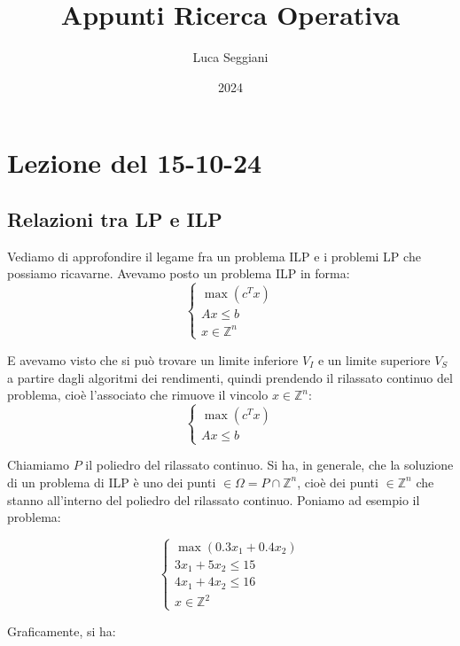 \documentclass[a4paper,11pt]{article}
\title{Appunti Ricerca Operativa}
\author{Luca Seggiani}
\date{2024}
\begin{document}
\section{Lezione del 15-10-24}

\thispagestyle{empty}
\pagestyle{fancy}


\subsection{Relazioni tra LP e ILP}
Vediamo di approfondire il legame fra un problema ILP e i problemi LP che possiamo ricavarne.
Avevamo posto un problema ILP in forma:
\[
	\begin{cases}
			\max (c^T x) \\ 
			Ax \leq b \\ 
			x \in \mathbb{Z}^n
	\end{cases}
\]

E avevamo visto che si può trovare un limite inferiore $V_I$ e un limite superiore $V_S$ a partire dagli algoritmi dei rendimenti, quindi prendendo il rilassato continuo del problema, cioè l'associato che rimuove il vincolo $x \in \mathbb{Z}^n$:
\[
	\begin{cases}
			\max (c^T x) \\ 
			Ax \leq b
	\end{cases}
\]

Chiamiamo $P$ il poliedro del rilassato continuo.
Si ha, in generale, che la soluzione di un problema di ILP è uno dei punti $\in \Omega = P \cap \mathbb{Z}^n$, cioè dei punti $\in \mathbb{Z}^n$ che stanno all'interno del poliedro del rilassato continuo.
Poniamo ad esempio il problema:

\[
	\begin{cases}
		\max(0.3 x_1 + 0.4 x_2) \\
		3 x_1 + 5 x_2 \leq 15 \\ 
		4 x_1 +  4 x_2 \leq 16 \\ 
		x \in \mathbb{Z}^2
	\end{cases}
\]

Graficamente, si ha:
\end{document}

